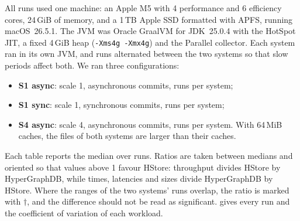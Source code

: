 All runs used one machine: an Apple M5 with 4 performance and 6 efficiency cores, 24\,GiB of memory, and a 1\,TB Apple SSD formatted with APFS, running macOS~26.5.1. The JVM was Oracle GraalVM for JDK~25.0.4 with the HotSpot JIT, a fixed 4\,GiB heap (\texttt{-Xms4g -Xmx4g}) and the Parallel collector. Each system ran in its own JVM, and runs alternated between the two systems so that slow periods affect both. We ran three configurations:
\begin{itemize}
\item \textbf{S1 async}: scale 1, asynchronous commits,  runs per system;
\item \textbf{S1 sync}: scale 1, synchronous commits,  runs per system;
\item \textbf{S4 async}: scale 4, asynchronous commits,  runs per system. With 64\,MiB caches, the files of both systems are larger than their caches.
\end{itemize}
Each table reports the median over runs. Ratios are taken between medians and oriented so that values above 1 favour HStore: throughput divides HStore by HyperGraphDB, while times, latencies and sizes divide HyperGraphDB by HStore. Where the ranges of the two systems' runs overlap, the ratio is marked with $\dagger$, and the difference should not be read as significant.  gives every run and the coefficient of variation of each workload.
